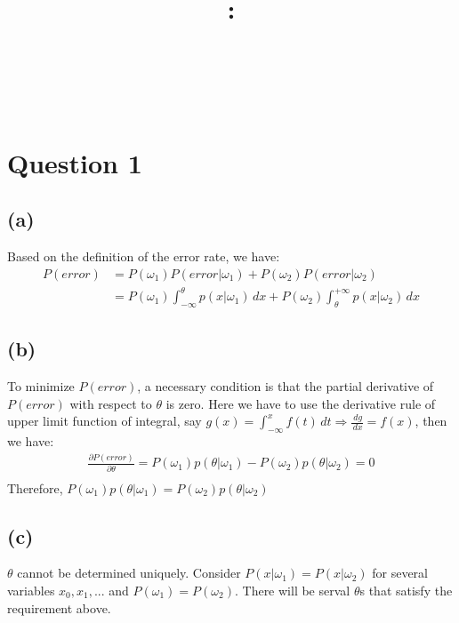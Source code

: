 \documentclass{article}
\title{
    \vspace{2in}
    \textmd{\textbf{\courseName}:\homeworkTitle}\\
    \vspace{0.1in}
    \large{\studentId}\\
    \large{\studentName}\\
    \vspace{3in}
}
\newcommand{\question}[1]{\section*{Question #1}}
\renewcommand{\part}[1]{\subsection*{(#1)}}
\begin{document}
\maketitle
\date{}
\pagebreak


\question{1}

\part{a}
Based on the definition of the error rate, we have:
\begin{align*}
P(error) &= P(\omega_1)P(error|\omega_1) + P(\omega_2)P(error|\omega_2)\\
         &= P(\omega_1)\int^\theta_{-\infty}p(x|\omega_1)\,dx + P(\omega_2)\int^{+\infty}_{\theta}p(x|\omega_2)\,dx
\end{align*}


\part{b}
To minimize $P(error)$, a necessary condition is that the partial derivative of $P(error)$ with respect to $\theta$ is zero. Here we have to use the derivative rule of upper limit function of integral, say $g(x) = \int^x_{-\infty}f(t)\,dt \Rightarrow \frac{\,dg}{\,dx} = f(x)$, then we have:
\begin{align*}
  \frac{\partial P(error)}{\partial\theta} = P(\omega_1)p(\theta|\omega_1) - P(\omega_2)p(\theta|\omega_2) = 0\\
\end{align*}
Therefore, $P(\omega_1)p(\theta|\omega_1) = P(\omega_2)p(\theta|\omega_2)$

\part{c}
$\theta$ cannot be determined uniquely. Consider $P(x|\omega_1) = P(x|\omega_2)$ for several variables ${x_0, x_1, ...}$ and $P(\omega_1) = P(\omega_2)$. There will be serval $\theta$s that satisfy the requirement above. \\
\end{document}
